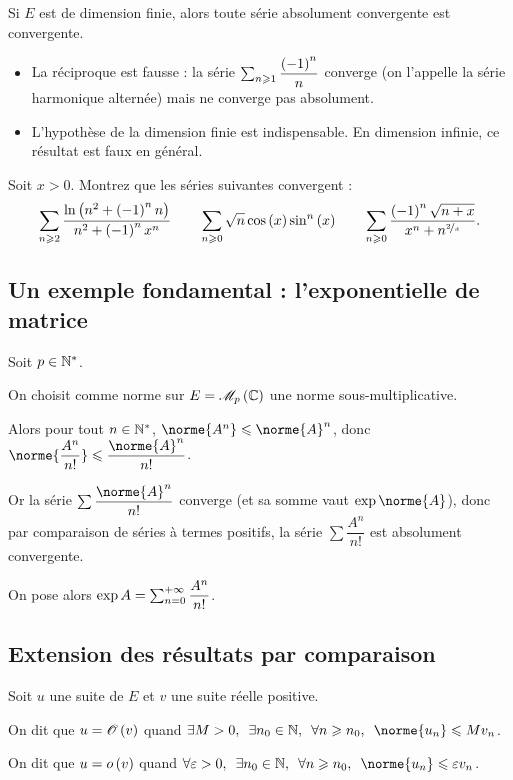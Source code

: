 \begin{theo}
Si \(E\) est de dimension finie, alors toute série absolument convergente est convergente.
\end{theo}

\begin{rem}
\begin{itemize}
    \item La réciproque est fausse : la série \(\sum_{n\geqslant1}\dfrac{\left(-1\right)^n}{n}\) converge (on l'appelle la série harmonique alternée) mais ne converge pas absolument. \\
    \item L'hypothèse de la dimension finie est indispensable. En dimension infinie, ce résultat est faux en général.
\end{itemize}
\end{rem}

\begin{exo}
Soit \(x>0\). Montrez que les séries suivantes convergent : \[\sum_{n\geqslant2}\dfrac{\ln\left(n^2+\left(-1\right)^nn\right)}{n^2+\left(-1\right)^nx^n}\qquad\sum_{n\geqslant0}\sqrt{n}\cos\left(x\right)\sin^n\left(x\right)\qquad\sum_{n\geqslant0}\dfrac{\left(-1\right)^n\sqrt{n+x}}{x^n+n^{\nicefrac{2}{x}}}.\]
\end{exo}

\subsection{Un exemple fondamental : l'exponentielle de matrice}

Soit \(p\in\mathbb{N}^*\).

On choisit comme norme sur \(E=\M{p}[\C]\) une norme sous-multiplicative.

Alors pour tout \(n\in\mathbb{N}^*\), \(\norme{A^n}\leq\norme{A}^n\), donc \(\norme{\dfrac{A^n}{n!}}\leq\dfrac{\norme{A}^n}{n!}\).

Or la série \(\sum\dfrac{\norme{A}^n}{n!}\) converge (et sa somme vaut \(\exp\norme{A}\)), donc par comparaison de séries à termes positifs, la série \(\sum\dfrac{A^n}{n!}\) est absolument convergente.

On pose alors \(\exp A=\sum_{n=0}^{+\infty}\dfrac{A^n}{n!}\).

\subsection{Extension des résultats par comparaison}

\begin{defi}
Soit \(u\) une suite de \(E\) et \(v\) une suite réelle positive.

On dit que \(u=\mathscr{O}\left(v\right)\) quand \(\quantifs{\exists M>0;\exists n_0\in\N;\forall n\geq n_0}\norme{u_n}\leq Mv_n\).

On dit que \(u=o\left(v\right)\) quand \(\quantifs{\forall\epsilon>0;\exists n_0\in\N;\forall n\geq n_0}\norme{u_n}\leq\epsilon v_n\).
\end{defi}

